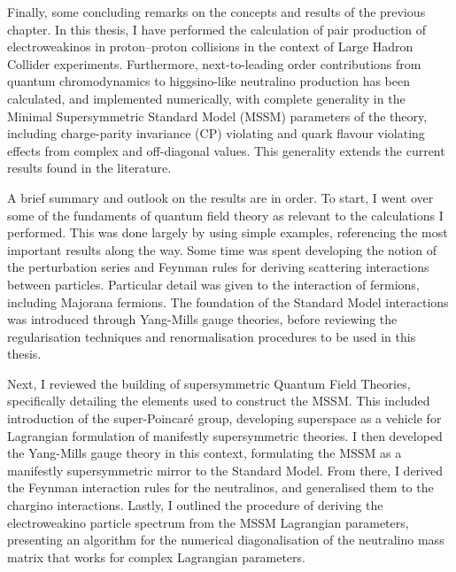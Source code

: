 Finally, some concluding remarks on the concepts and results of the previous chapter.
In this thesis, I have performed the calculation of pair production of electroweakinos in proton--proton collisions in the context of Large Hadron Collider experiments.
Furthermore, next-to-leading order contributions from quantum chromodynamics to higgsino-like neutralino production has been calculated, and implemented numerically, with complete generality in the Minimal Supersymmetric Standard Model (MSSM) parameters of the theory, including charge-parity invariance (CP) violating and quark flavour violating effects from complex and off-diagonal values.
This generality extends the current results found in the literature.
\medskip

A brief summary and outlook on the results are in order.
To start, I went over some of the fundaments of quantum field theory as relevant to the calculations I performed.
This was done largely by using simple examples, referencing the most important results along the way.
Some time was spent developing the notion of the perturbation series and Feynman rules for deriving scattering interactions between particles.
Particular detail was given to the interaction of fermions, including Majorana fermions.
The foundation of the Standard Model interactions was introduced through Yang-Mills gauge theories, before reviewing the regularisation techniques and renormalisation procedures to be used in this thesis.

Next, I reviewed the building of supersymmetric Quantum Field Theories, specifically detailing the elements used to construct the MSSM\@.
This included introduction of the super-Poincaré group, developing superspace as a vehicle for Lagrangian formulation of manifestly supersymmetric theories.
I then developed the Yang-Mills gauge theory in this context, formulating the MSSM as a manifestly supersymmetric mirror to the Standard Model.
From there, I derived the Feynman interaction rules for the neutralinos, and generalised them to the chargino interactions.
Lastly, I outlined the procedure of deriving the electroweakino particle spectrum from the MSSM Lagrangian parameters, presenting an algorithm for the numerical diagonalisation of the neutralino mass matrix that works for complex Lagrangian parameters.
\medskip

